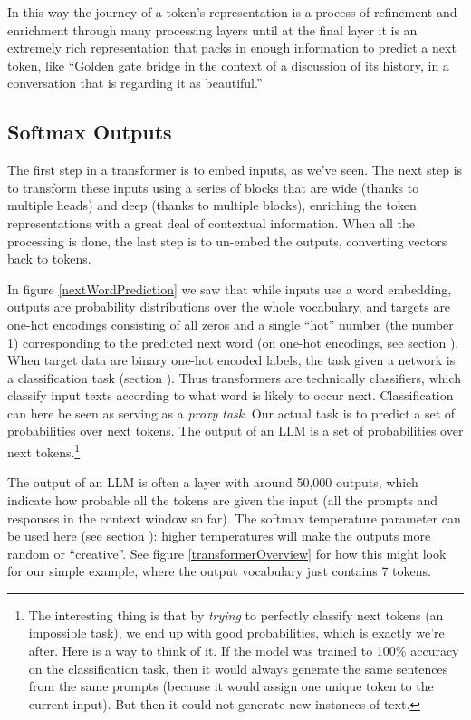 In this way the journey of a token's representation is a process of refinement and enrichment through many processing layers until at the final layer it is an extremely rich representation that packs in enough information to predict a next token, like ``Golden gate bridge in the context of a discussion of its history, in a conversation that is regarding it as beautiful.''

\subsection{Softmax Outputs}\label{llmOutput}

The first step in a transformer is to embed inputs, as we've seen. The next
step is to transform these inputs using a series of blocks that are wide
(thanks to multiple heads) and deep (thanks to multiple blocks), enriching the token representations with a great deal of contextual information. When all the
processing is done, the last step is to un-embed the outputs, converting
vectors back to tokens. 

In figure \ref{nextWordPrediction} we saw that while inputs use a word
embedding, outputs are probability distributions over the whole vocabulary, and
targets are one-hot encodings consisting of all zeros and a single ``hot''
number (the number 1) corresponding to the predicted next word (on one-hot
encodings, see section ). When target data are binary one-hot
encoded labels, the task given a network is a classification task (section
). Thus transformers are technically
classifiers, which classify input texts according to what word is likely to
occur next. Classification can here be seen as serving as a \emph{proxy task}.
Our actual task is to predict a set of probabilities over next tokens. The
output of an LLM is a set of probabilities over next tokens.\footnote{The
interesting thing is that by \emph{trying} to perfectly classify next tokens
(an impossible task), we end up with good probabilities, which is exactly we're
after. Here is a way to think of it. If the model was trained to 100\% accuracy
on the classification task, then it would always generate the same sentences
from the same prompts (because it would assign one unique token to the current
input). But then it could not generate new instances of text.}

The output of an LLM is often a  layer with around 50,000
outputs, which  indicate how probable all the tokens are given the input (all
the prompts and responses in the context window so far). The softmax
temperature parameter can be used here (see section
): higher temperatures will make the outputs more
random or ``creative''. See figure \ref{transformerOverview} for how this might
look for our simple example, where the output vocabulary just contains 7
tokens. 

